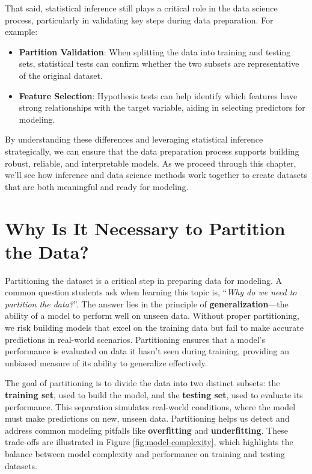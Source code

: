 \documentclass[
]{book}
\providecommand{\tightlist}{%
  \setlength{\itemsep}{0pt}\setlength{\parskip}{0pt}}
\theoremstyle{definition}
\theoremstyle{definition}
\theoremstyle{definition}
\theoremstyle{definition}
\theoremstyle{remark}
\begin{document}
That said, statistical inference still plays a critical role in the data science process, particularly in validating key steps during data preparation. For example:

\begin{itemize}
\tightlist
\item
  \textbf{Partition Validation}: When splitting the data into training and testing sets, statistical tests can confirm whether the two subsets are representative of the original dataset.
\item
  \textbf{Feature Selection}: Hypothesis tests can help identify which features have strong relationships with the target variable, aiding in selecting predictors for modeling.
\end{itemize}

By understanding these differences and leveraging statistical inference strategically, we can ensure that the data preparation process supports building robust, reliable, and interpretable models. As we proceed through this chapter, we'll see how inference and data science methods work together to create datasets that are both meaningful and ready for modeling.

\section{Why Is It Necessary to Partition the Data?}\label{why-is-it-necessary-to-partition-the-data}

Partitioning the dataset is a critical step in preparing data for modeling. A common question students ask when learning this topic is, ``\emph{Why do we need to partition the data?}''. The answer lies in the principle of \textbf{generalization}---the ability of a model to perform well on unseen data. Without proper partitioning, we risk building models that excel on the training data but fail to make accurate predictions in real-world scenarios. Partitioning ensures that a model's performance is evaluated on data it hasn't seen during training, providing an unbiased measure of its ability to generalize effectively.

The goal of partitioning is to divide the data into two distinct subsets: the \textbf{training set}, used to build the model, and the \textbf{testing set}, used to evaluate its performance. This separation simulates real-world conditions, where the model must make predictions on new, unseen data. Partitioning helps us detect and address common modeling pitfalls like \textbf{overfitting} and \textbf{underfitting}. These trade-offs are illustrated in Figure \ref{fig:model-complexity}, which highlights the balance between model complexity and performance on training and testing datasets.
\end{document}
